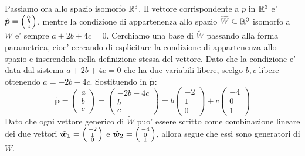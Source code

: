 \begin{solution}
\begin{enumerate}
        Passiamo ora allo spazio isomorfo $\mathbb{R}^3$. Il vettore corrispondente a $p$ in $\mathbb{R}^3$ e' $\bm{\tilde{p}} = \begin{psmallmatrix} a \\ b \\ c \end{psmallmatrix}$, mentre la condizione di appartenenza allo spazio $\widetilde{W} \subseteq \mathbb{R}^3$ isomorfo a $W$ e' sempre $a+2b+4c = 0$. Cerchiamo una base di $\widetilde{W}$ passando alla forma parametrica, cioe' cercando di esplicitare la condizione di appartenenza allo spazio e inserendola nella definizione stessa del vettore.
        Dato che la condizione e' data dal sistema $a+2b+4c = 0$ che ha due variabili libere, scelgo $b, c$ libere ottenendo $a = -2b - 4c$. Sostituendo in $\bm{\tilde{p}}$:\[
            \bm{\tilde p} = \begin{pmatrix} a \\ b \\ c \end{pmatrix} = \begin{pmatrix}
                -2b-4c\\b\\c
            \end{pmatrix} = b\begin{pmatrix} -2 \\ 1 \\ 0 \end{pmatrix} + c\begin{pmatrix} -4 \\ 0 \\ 1 \end{pmatrix}
        \]
        Dato che ogni vettore generico di $\widetilde{W}$ puo' essere scritto come combinazione lineare dei due vettori $\bm{\tilde{w}_1} = \begin{psmallmatrix} -2 \\ 1 \\ 0 \end{psmallmatrix}$ e $\bm{\tilde{w}_2} = \begin{psmallmatrix} -4 \\ 0 \\ 1 \end{psmallmatrix}$, allora segue che essi sono generatori di $W$. 
            

\end{enumerate}
\end{solution}
